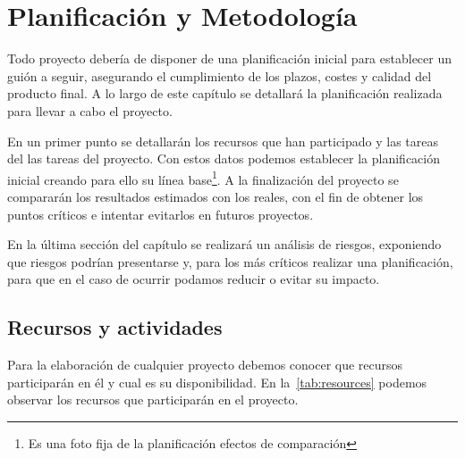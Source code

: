 \chapter{Planificación y Metodología}
\label{sec:manager}

Todo proyecto debería de disponer de una planificación inicial para establecer un guión a seguir, asegurando el cumplimiento de los plazos, costes y calidad del producto final. A lo largo de este capítulo se detallará la planificación realizada para llevar a cabo el proyecto.

En un primer punto se detallarán los recursos que han participado y las tareas del  las tareas del proyecto. Con estos datos podemos establecer la planificación inicial creando para ello su línea base\footnote{Es una foto fija de la planificación efectos de comparación}. A la finalización del proyecto se compararán los resultados estimados con los reales, con el fin de obtener los puntos críticos e intentar evitarlos en futuros proyectos.

En la última sección del capítulo se realizará un análisis de riesgos, exponiendo que riesgos podrían presentarse y, para los más críticos realizar una planificación, para que en el caso de ocurrir podamos reducir o evitar su impacto.

\section{Recursos y actividades}
\label{sec:manager:resources}

Para la elaboración de cualquier proyecto debemos conocer que recursos participarán en él y cual es su disponibilidad. En la~\cref{tab:resources} podemos observar los recursos que participarán en el proyecto.

